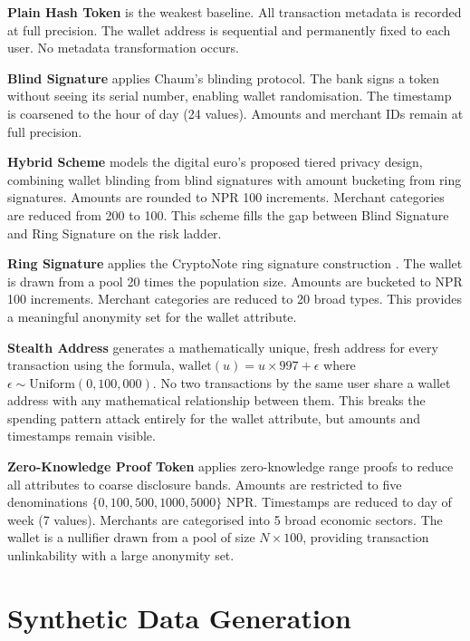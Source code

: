 \textbf{Plain Hash Token} is the weakest baseline. All
transaction metadata is recorded at full precision. The
wallet address is sequential and permanently fixed to each
user. No metadata transformation occurs.

\textbf{Blind Signature} applies Chaum's
\cite{chaum1983} blinding protocol. The bank signs a
token without seeing its serial number, enabling wallet
randomisation. The timestamp is coarsened to the hour of
day (24 values). Amounts and merchant IDs remain at full
precision.

\textbf{Hybrid Scheme} models the digital euro's proposed
tiered privacy design, combining wallet blinding from blind
signatures with amount bucketing from ring signatures.
Amounts are rounded to NPR 100 increments. Merchant
categories are reduced from 200 to 100. This scheme fills
the gap between Blind Signature and Ring Signature on the
risk ladder.

\textbf{Ring Signature} applies the CryptoNote ring
signature construction \cite{vansaberhagen2013}. The
wallet is drawn from a pool 20 times the population size.
Amounts are bucketed to NPR 100 increments. Merchant
categories are reduced to 20 broad types. This provides
a meaningful anonymity set for the wallet attribute.

\textbf{Stealth Address} generates a mathematically unique,
fresh address for every transaction using the formula,
$\text{wallet}(u) = u \times 997 + \epsilon$ where
$\epsilon \sim \text{Uniform}(0, 100{,}000)$. No two
transactions by the same user share a wallet address with
any mathematical relationship between them. This breaks
the spending pattern attack entirely for the wallet
attribute, but amounts and timestamps remain visible.

\textbf{Zero-Knowledge Proof Token} applies zero-knowledge range proofs
\cite{groth2015} to reduce all attributes to coarse
disclosure bands. Amounts are restricted to five
denominations $\{0, 100, 500, 1000, 5000\}$ NPR.
Timestamps are reduced to day of week (7 values). Merchants
are categorised into 5 broad economic sectors. The wallet
is a nullifier drawn from a pool of size $N \times 100$,
providing transaction unlinkability with a large anonymity
set.

\section{Synthetic Data Generation}
\label{sec:data_gen}

